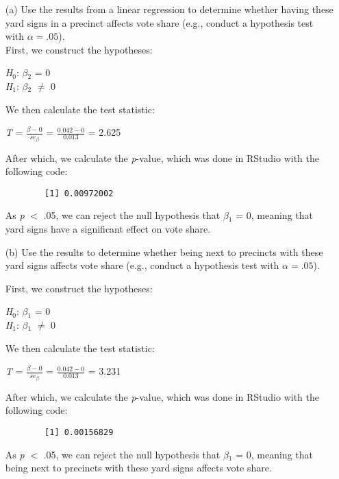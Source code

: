 \documentclass[12pt,letterpaper]{article}
\begin{document}
\vspace{.5cm}
\begin{enumerate}
	\item [(a)] Use the results from a linear regression to determine whether having these yard signs in a precinct affects vote share (e.g., conduct a hypothesis test with $\alpha = .05$). \\
	
	\noindent First, we construct the hypotheses:
	\begin{center}
		\textit{H}$_{0}$: $\beta$$_{2}$ = 0 \\
		\textit{H}$_{1}$: $\beta$$_{2}$ $\neq$ 0
	\end{center}
	\noindent We then calculate the test statistic:
	\begin{center}
		\textit{T} = $\frac{\beta - 0}{se_\beta}$ = $\frac{0.042 - 0}{0.013}$ = 2.625
	\end{center}
	\noindent After which, we calculate the \textit{p}-value, which was done in RStudio with the following code:
	
	\begin{verbatim}
		[1] 0.00972002
	\end{verbatim}
	\noindent As \textit{p} $<$ .05, we can reject the null hypothesis that $\beta$$_{1}$ = 0, meaning that yard signs have a significant effect on vote share.
	
	\newpage		
	\item [(b)]  Use the results to determine whether being
	next to precincts with these yard signs affects vote
	share (e.g., conduct a hypothesis test with $\alpha = .05$).
	
		\noindent First, we construct the hypotheses:
	\begin{center}
		\textit{H}$_{0}$: $\beta$$_{1}$ = 0 \\
		\textit{H}$_{1}$: $\beta$$_{1}$ $\neq$ 0
	\end{center}
	\noindent We then calculate the test statistic:
	\begin{center}
		\textit{T} = $\frac{\beta - 0}{se_\beta}$ = $\frac{0.042 - 0}{0.013}$ = 3.231
	\end{center}
	\noindent After which, we calculate the \textit{p}-value, which was done in RStudio with the following code:
	
	\begin{verbatim}
		[1] 0.00156829
	\end{verbatim}
	\noindent As \textit{p} $<$ .05, we can reject the null hypothesis that $\beta$$_{1}$ = 0, meaning that being next to precincts with these yard signs affects vote share.
	

\end{enumerate}
\end{document}
